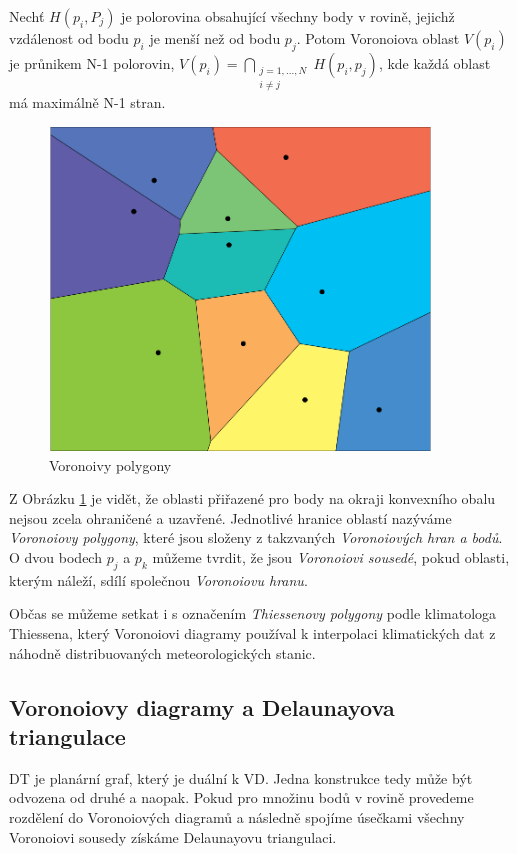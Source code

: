 \documentclass[12pt,a4paper]{article}
\begin{document}
Nechť $H(p_i,P_j)$ je polorovina obsahující všechny body v rovině, jejichž vzdálenost od bodu $p_i$ je menší než od bodu $p_j$. Potom Voronoiova oblast $V(p_i)$ je průnikem N-1 polorovin,
$V(p_i)= \bigcap\limits_{\substack{j=1,...,N \\ i\not=j}}H(p_i,p_j)$, kde každá oblast má maximálně N-1 stran.

\newpage
\begin{figure}[h!]
\centering
\includegraphics[width=0.9\textwidth]{img/vor_pol.png}
\caption{Voronoivy polygony}
\label{fig:vor_pol}
\end{figure}

Z Obrázku \ref{fig:vor_pol} je vidět, že oblasti přiřazené pro body na okraji konvexního obalu nejsou zcela ohraničené a uzavřené. Jednotlivé hranice oblastí nazýváme \emph{Voronoiovy polygony}, které jsou složeny z takzvaných \emph{Voronoiových hran a bodů}. O dvou bodech $p_j$ a $p_k$ můžeme tvrdit, že jsou \emph{Voronoiovi sousedé}, pokud oblasti, kterým náleží, sdílí společnou \emph{Voronoiovu hranu}. 

Občas se můžeme setkat i s označením \emph{Thiessenovy polygony} podle klimatologa Thiessena, který Voronoiovi diagramy používal k interpolaci klimatických dat z náhodně distribuovaných meteorologických stanic.

\newpage
\subsection{Voronoiovy diagramy a Delaunayova triangulace}
\label{sub:VDaDT}

DT je planární graf, který je duální k VD. Jedna konstrukce tedy může být odvozena od druhé a naopak. 
Pokud pro množinu bodů v rovině provedeme rozdělení do Voronoiových diagramů a následně spojíme úsečkami všechny Voronoiovi sousedy získáme Delaunayovu triangulaci.
\end{document}
